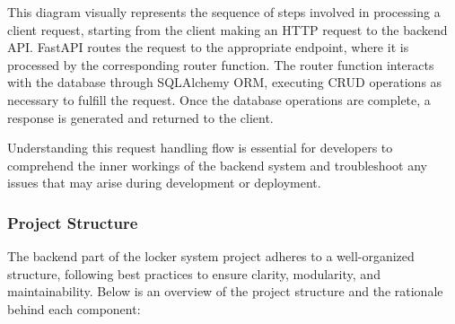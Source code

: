 This diagram visually represents the sequence of steps involved in processing a client request, starting from the client making an HTTP request to the backend API. FastAPI routes the request to the appropriate endpoint, where it is processed by the corresponding router function. The router function interacts with the database through SQLAlchemy ORM, executing CRUD operations as necessary to fulfill the request. Once the database operations are complete, a response is generated and returned to the client.

Understanding this request handling flow is essential for developers to comprehend the inner workings of the backend system and troubleshoot any issues that may arise during development or deployment.


\subsubsection{Project Structure}

The backend part of the locker system project adheres to a well-organized structure, following best practices to ensure clarity, modularity, and maintainability. Below is an overview of the project structure and the rationale behind each component:

